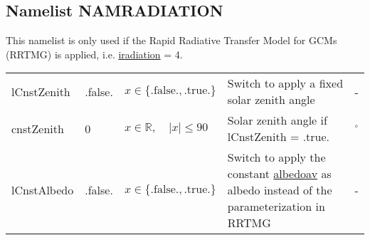 \documentclass[twoside,11pt,fleqn,a4paper,english,openright]{report}
\begin{document}
\subsection{Namelist NAMRADIATION}\label{par:radiation}
This namelist is only used if the Rapid Radiative Transfer Model for GCMs (RRTMG) is applied, i.e.  \hyperlink{iradiation}{iradiation} = 4.
\begin{center}
  \tablelasttail{
        &&&&\\\hline
  }
\begin{supertabular}{|l|p{2cm}|p{4cm}|p{6cm}|l|}
   lCnstZenith	&	.false.	& $x\in\{\text{.false.},\text{.true.}\}$	& Switch to apply a fixed solar zenith angle	& -\\
   cnstZenith	&	0	& $x \in \mathbb{R}, \quad \vert x\vert \leq 90 $	& Solar zenith angle if lCnstZenith = .true.	& $^{\circ}$\\
   lCnstAlbedo	&	.false.	& $x\in\{\text{.false.},\text{.true.}\}$	& Switch to apply the constant \hyperlink{albedo}{albedoav} as albedo instead of the parameterization in RRTMG	& -\\

\end{supertabular}
\end{center}
\end{document}
